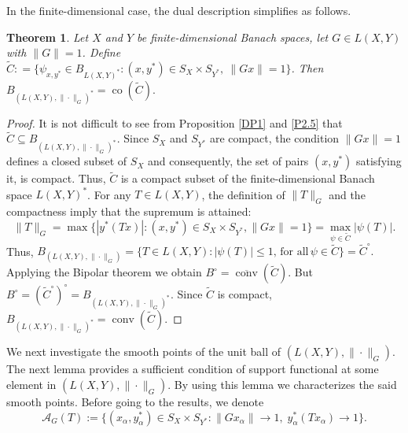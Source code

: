 \documentclass[12pt]{amsart}
\newtheorem{theorem}{Theorem}[section]
\theoremstyle{definition}
\numberwithin{equation}{section}
\begin{document}
	In the finite-dimensional case, the dual description simplifies as follows.
	
	\begin{theorem}\label{Th2}
		Let $X$ and $Y$ be finite-dimensional Banach spaces, let $G \in  L(X, Y)$ with $\|G\| = 1$. Define $\widetilde{C}: = \bigl\{ \psi_{x,y^*}\in B_{L(X,Y)^*} : (x,y^*) \in S_X \times S_{Y^*},\ \|Gx\| = 1 \bigr\}$. Then $B_{( L(X, Y), \|\cdot\|_G)^*} = \operatorname{co}(\widetilde{C}).$
	\end{theorem}
	
	\begin{proof}
		It is not difficult to see from Proposition \ref{DP1} and \ref{P2.5} that $\widetilde{C}\subseteq B_{(L(X, Y),\|\cdot\|_G)^*}$. Since $S_X$ and $S_{Y^*}$ are compact, the condition $ \|Gx\| = 1$ defines a closed subset of $ S_X$ and consequently, the set of pairs $ (x,y^*) $ satisfying it, is compact. Thus, $\widetilde{C}$ is a compact subset of the finite-dimensional Banach space $ L(X, Y)^*$. For any $ T \in  L(X, Y) $, the definition of $ \|T\|_G $ and the compactness imply that the supremum is attained:
		\[
		\|T\|_G = \max \{|y^*(Tx)|: (x,y^*) \in S_X \times S_{Y^*}, \|Gx\| = 1\}= \max_{\psi \in \widetilde{C}} |\psi(T)|.
		\]
		Thus, $B_{( L(X, Y), \|\cdot\|_G)}=\{T\in L(X, Y):|\psi(T)| \le 1,\, \text{for all}\, \psi \in \widetilde{C}\}= \widetilde{C}^\circ.$ Applying the Bipolar theorem we obtain $B^\circ = \overline{\operatorname{conv}}(\widetilde{C}).$ But $B^\circ = (\widetilde{C}^\circ)^\circ = B_{( L(X, Y), \|\cdot\|_G)^*}$. Since $\widetilde{C}$ is compact, $B_{( L(X, Y), \|\cdot\|_G)^*} = \operatorname{conv}(\widetilde{C})$.
	\end{proof}
	
	We next investigate the smooth points of the unit ball of $( L(X, Y ),\|\cdot\|_G)$. The next lemma provides a sufficient condition of support functional at some element in $( L(X, Y ),\|\cdot\|_G)$. By using this lemma we characterizes the said smooth points. Before going to the results, we denote
	\[
	\mathcal{A}_G(T):=\bigl\{(x_\alpha,y_\alpha^*)\in S_X\times S_{Y^*}:\|Gx_\alpha\|\to1,\;y_\alpha^*(Tx_\alpha)\to 1\bigr\}.
	\]
	
\end{document}
